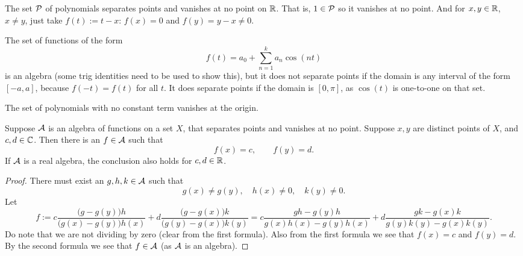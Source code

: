 \begin{example}
The set ${\mathcal{P}}$ of polynomials separates points and vanishes at no point
on ${\mathbb{R}}$.  That is, $1 \in {\mathcal{P}}$ so it vanishes at no point.  And for $x,y \in
{\mathbb{R}}$, $x\not= y$, just take $f(t) := t-x$: $f(x) = 0$ and $f(y) = y-x
\not= 0$.
\end{example}

\begin{example}
The set of functions of the form
\begin{equation*}
f(t) = a_0 + \sum_{n=1}^k a_n \cos(nt)
\end{equation*}
is an algebra (some trig identities need to be used to show this), but
it
does not separate points if the domain is any interval of the form
$[-a,a]$, because $f(-t) = f(t)$ for all $t$.
It does separate points if the domain is $[0,\pi]$, as $\cos(t)$
is one-to-one on that set.
\end{example}

\begin{example}
The set of polynomials with no constant term vanishes at the origin.
\end{example}

\begin{prop} \label{prop:SWinterpolate}
Suppose ${\mathcal{A}}$ is an algebra of functions on a set $X$, that separates points
and vanishes at no point.  Suppose $x,y$ are distinct points of $X$, and
$c,d \in {\mathbb{C}}$.  Then there is an $f \in {\mathcal{A}}$ such that
\begin{equation*}
f(x) = c, \qquad f(y) = d .
\end{equation*}
If ${\mathcal{A}}$ is a real algebra, the conclusion also holds for $c,d \in {\mathbb{R}}$.
\end{prop}

\begin{proof}
There must exist an $g,h,k \in {\mathcal{A}}$
such that 
\begin{equation*}
g(x) \not= g(y), \quad h(x) \not= 0, \quad k(y) \not= 0 .
\end{equation*}
Let
\begin{equation*}
f := 
c
\frac{\bigl(g - g(y)\bigr)h}{\bigl(g(x)-g(y)\bigr)h(x) } + 
d
\frac{\bigl(g - g(x)\bigr)k}{\bigl(g(y)-g(x)\bigr)k(y)}
=
c
\frac{gh - g(y)h}{g(x)h(x)-g(y)h(x) } + 
d
\frac{gk - g(x)k}{g(y)k(y)-g(x)k(y)} .
\end{equation*}
Do note that we are not dividing by zero (clear from the first formula).
Also from the first formula we see that $f(x) = c$ and $f(y) = d$.
By the second formula we see that $f \in {\mathcal{A}}$ (as ${\mathcal{A}}$ is an algebra).
\end{proof}

